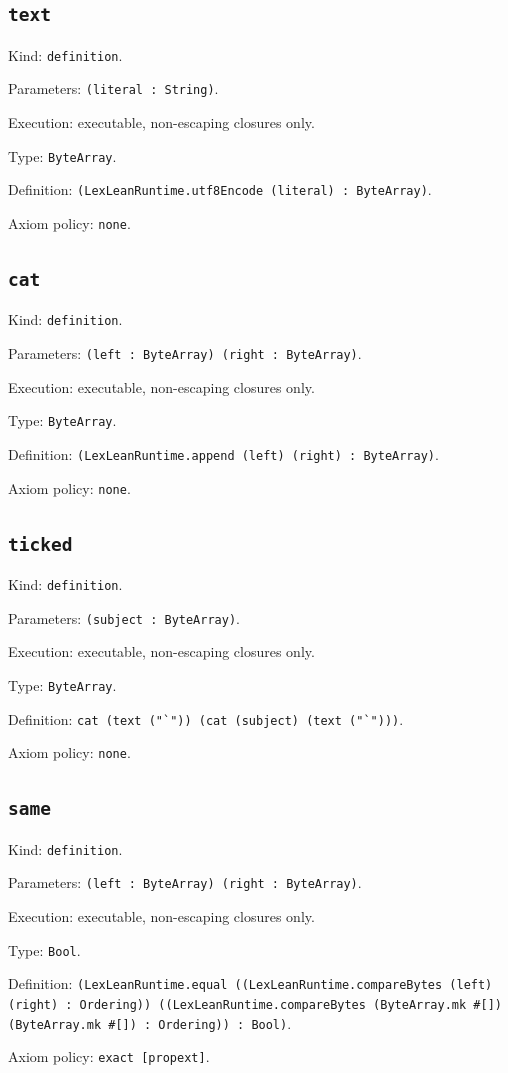 \documentclass[11pt]{article}
\begin{document}
\subsection*{\texttt{text}}
\noindent Kind: \texttt{definition}.\par
\noindent Parameters: \texttt{(literal : String)}.\par
\noindent Execution: executable, non-escaping closures only.\par
\noindent Type: \texttt{ByteArray}.\par
\noindent Definition: \texttt{(LexLeanRuntime.utf8Encode (literal) : ByteArray)}.\par
\noindent Axiom policy: \texttt{none}.\par
\subsection*{\texttt{cat}}
\noindent Kind: \texttt{definition}.\par
\noindent Parameters: \texttt{(left : ByteArray) (right : ByteArray)}.\par
\noindent Execution: executable, non-escaping closures only.\par
\noindent Type: \texttt{ByteArray}.\par
\noindent Definition: \texttt{(LexLeanRuntime.append (left) (right) : ByteArray)}.\par
\noindent Axiom policy: \texttt{none}.\par
\subsection*{\texttt{ticked}}
\noindent Kind: \texttt{definition}.\par
\noindent Parameters: \texttt{(subject : ByteArray)}.\par
\noindent Execution: executable, non-escaping closures only.\par
\noindent Type: \texttt{ByteArray}.\par
\noindent Definition: \texttt{cat (text ("`")) (cat (subject) (text ("`")))}.\par
\noindent Axiom policy: \texttt{none}.\par
\subsection*{\texttt{same}}
\noindent Kind: \texttt{definition}.\par
\noindent Parameters: \texttt{(left : ByteArray) (right : ByteArray)}.\par
\noindent Execution: executable, non-escaping closures only.\par
\noindent Type: \texttt{Bool}.\par
\noindent Definition: \texttt{(LexLeanRuntime.equal ((LexLeanRuntime.compareBytes (left) (right) : Ordering)) ((LexLeanRuntime.compareBytes (ByteArray.mk \#[]) (ByteArray.mk \#[]) : Ordering)) : Bool)}.\par
\noindent Axiom policy: \texttt{exact [propext]}.\par
\end{document}
